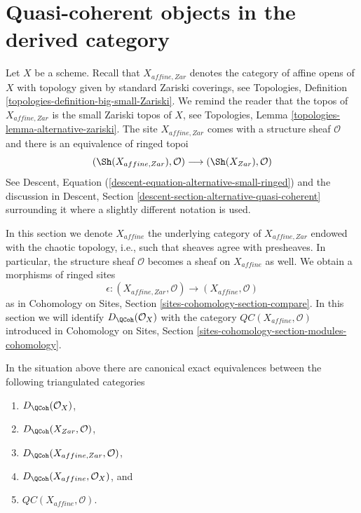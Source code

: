 \section{Quasi-coherent objects in the derived category}
\label{section-QC}

\noindent
Let $X$ be a scheme. Recall that $X_{affine, Zar}$
denotes the category of affine opens of $X$ with topology given
by standard Zariski coverings, see
Topologies, Definition \ref{topologies-definition-big-small-Zariski}.
We remind the reader that the topos of $X_{affine, Zar}$
is the small Zariski topos of $X$, see Topologies, Lemma
\ref{topologies-lemma-alternative-zariski}. The site $X_{affine, Zar}$
comes with a structure sheaf $\mathcal{O}$ and there is an
equivalence of ringed topoi
$$
(\Sh(X_{affine, Zar}), \mathcal{O})
\longrightarrow
(\Sh(X_{Zar}), \mathcal{O})
$$
See Descent, Equation (\ref{descent-equation-alternative-small-ringed})
and the discussion in
Descent, Section \ref{descent-section-alternative-quasi-coherent}
surrounding it where a slightly different notation is used.

\medskip\noindent
In this section we denote $X_{affine}$ the underlying category of
$X_{affine, Zar}$ endowed with the chaotic topology, i.e., such that sheaves
agree with presheaves. In particular, the structure sheaf $\mathcal{O}$
becomes a sheaf on $X_{affine}$ as well.
We obtain a morphisms of ringed sites
$$
\epsilon :
(X_{affine, Zar}, \mathcal{O})
\longrightarrow
(X_{affine}, \mathcal{O})
$$
as in Cohomology on Sites, Section \ref{sites-cohomology-section-compare}.
In this section we will identify $D_\QCoh(\mathcal{O}_X)$ with
the category $\mathit{QC}(X_{affine}, \mathcal{O})$ introduced in
Cohomology on Sites, Section \ref{sites-cohomology-section-modules-cohomology}.

\begin{lemma}
\label{lemma-DQCoh-alternative-small}
In the situation above there are canonical exact equivalences between
the following triangulated categories
\begin{enumerate}
\item $D_\QCoh(\mathcal{O}_X)$,
\item $D_\QCoh(X_{Zar}, \mathcal{O})$,
\item $D_\QCoh(X_{affine, Zar}, \mathcal{O})$,
\item $D_\QCoh(X_{affine}, \mathcal{O}_X)$, and
\item $\mathit{QC}(X_{affine}, \mathcal{O})$.
\end{enumerate}
\end{lemma}


